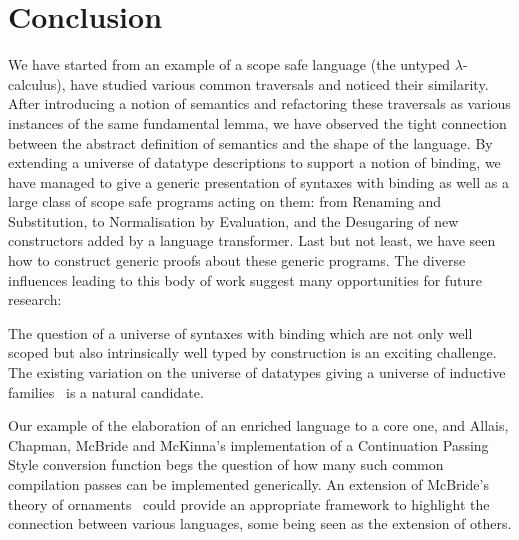 
\section{Conclusion}

We have started from an example of a scope safe language (the
untyped $\lambda$-calculus), have studied various common traversals
and noticed their similarity. After introducing a notion of semantics
and refactoring these traversals as various instances of the same
fundamental lemma, we have observed the tight connection between the
abstract definition of semantics and the shape of the language. By
extending a universe of datatype descriptions to support a notion of
binding, we have managed to give a generic presentation of syntaxes
with binding as well as a large class of scope safe programs acting
on them: from Renaming and Substitution, to Normalisation by Evaluation,
and the Desugaring of new constructors added by a language transformer.
Last but not least, we have seen how to construct generic proofs about
these generic programs. The diverse influences leading to this body of
work suggest many opportunities for future research:

The question of a universe of syntaxes with binding which are not only
well scoped but also intrinsically well typed by construction is an
exciting challenge. The existing variation on the universe of datatypes
giving a universe of inductive families~\cite{dybjer1994inductive}
is a natural candidate.

Our example of the elaboration of an enriched language to a core one,
and Allais, Chapman, McBride and McKinna's implementation of a
Continuation Passing Style conversion function begs the question of how
many such common compilation passes can be implemented generically.
An extension of McBride's theory of ornaments~\citeyear{mcbride2010ornamental}
could provide an appropriate framework to highlight the connection
between various languages, some being seen as the extension of others.

\newpage
